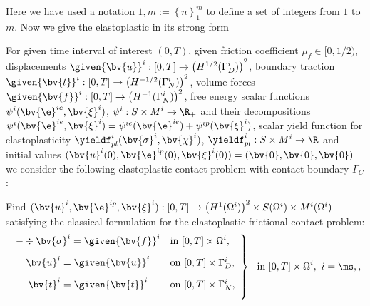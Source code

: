 Here we have used a notation $\overline{1,m}:=\left\lbrace n\right\rbrace_{1}^{m} $ to define a set of integers from $1$ to $m$. Now we give the elastoplastic in its strong form
\begin{problem}\label{prob:ElPlStrong}For given  time interval  of interest $(0,T)$, given  friction coefficient $\mu_f \in [0,1/2) $, displacements $\given{\bv{u}}^i: [0,T] \rightarrow \left(H^{1/2}(\Gamma_D^i)\right)^2$, boundary traction 
$\given{\bv{t}}^i: [0,T] \rightarrow \left(H^{-1/2}(\Gamma_N^i)\right)^2$, volume forces $\given{\bv{f}}^i: [0,T]\rightarrow \left(H^{-1}(\Gamma_N^i)\right)^2$, free energy scalar functions $\psi^i(\bv{\e}^{ie},\bv{\xi}^i)$, $\psi^i:S\times M^i\rightarrow \R_{+}$ and their decompositions $\psi^i(\bv{\e}^{ie},\bv{\xi}^i)=\psi^{ie}(\bv{\e}^{ie})+\psi^{ip}(\bv{\xi}^i)$, scalar yield  function for elastoplasticity $\yieldf_{pl}^i(\bv{\sigma}^i,\bv{\chi}^i)$, $\yieldf_{pl}^i:S\times M^i\rightarrow \R$ and initial values $(\bv{u}^i(0),\bv{\e}^{ip}(0),\bv{\xi}^{i}(0))=(\bv{0},\bv{0},\bv{0})$ we consider the following
elastoplastic contact problem with contact boundary $\Gamma_C$: 

Find $(\bv{u}^i,\bv{\e}^{ip},\bv{\xi}^i): [0,T] \rightarrow \left(H^{1}(\Omega^i)\right)^2\times S(\Omega^i)\times M^i(\Omega^i)$ satisfying the classical formulation for the elastoplastic frictional contact problem:
\begin{equation} \label{eq:ElPlContStrongFormEquilibrium}
\left. 
   \begin{array}{cl}
    -\div \bv{\sigma}^i = \given{\bv{f}}^i &\mbox{in } [0,T]\times\Omega^i, \\[2ex]
    \bv{u}^i = \given{\bv{u}}^i&\mbox{on }[0,T]\times\Gamma_D^i, \\[2ex]
    \bv{t}^i = \given{\bv{t}}^i&\mbox{on }[0,T]\times\Gamma_N^i, \\[2ex]
    \end{array}\right\rbrace~ \mbox{ in }[0,T]\times\Omega^i,~ i=\ms,\sl,
\end{equation}


\end{problem}

